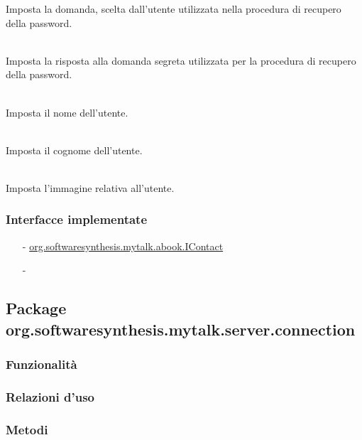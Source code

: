 \begin{description}
Imposta la domanda, scelta dall'utente utilizzata nella procedura di recupero della password.
	\item{}\\
Imposta la risposta alla domanda segreta utilizzata per la procedura di recupero della password.
	\item{}\\
Imposta il nome dell'utente.
	\item{}\\
Imposta il cognome dell'utente.
	\item{}\\
Imposta l'immagine relativa all'utente.
\end{description}

\subsubsection*{Interfacce implementate}
\begin{itemize}[noitemsep,nolistsep]
  \item[-] \hyperref[IContact]{\ttfamily{}org.softwaresynthesis.mytalk.abook.IContact}
  \item[-] 
\end{itemize}

\subsection{Package org.softwaresynthesis.mytalk.server.connection}\label{sec:connection}


\subsubsection*{Funzionalità}

\subsubsection*{Relazioni d'uso}


\subsubsection*{Metodi}


